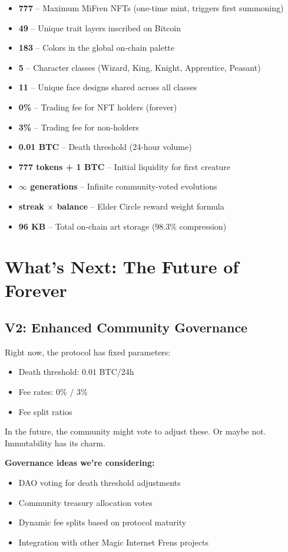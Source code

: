 \documentclass[11pt,a4paper]{article}
\begin{document}
\begin{itemize}
    \item \textbf{777} -- Maximum MiFren NFTs (one-time mint, triggers first summoning)
    \item \textbf{49} -- Unique trait layers inscribed on Bitcoin
    \item \textbf{183} -- Colors in the global on-chain palette
    \item \textbf{5} -- Character classes (Wizard, King, Knight, Apprentice, Peasant)
    \item \textbf{11} -- Unique face designs shared across all classes
    \item \textbf{0\%} -- Trading fee for NFT holders (forever)
    \item \textbf{3\%} -- Trading fee for non-holders
    \item \textbf{0.01 BTC} -- Death threshold (24-hour volume)
    \item \textbf{777 tokens + 1 BTC} -- Initial liquidity for first creature
    \item \textbf{$\infty$ generations} -- Infinite community-voted evolutions
    \item \textbf{streak $\times$ balance} -- Elder Circle reward weight formula
    \item \textbf{96 KB} -- Total on-chain art storage (98.3\% compression)
\end{itemize}

\section{What's Next: The Future of Forever}

\subsection{V2: Enhanced Community Governance}

Right now, the protocol has fixed parameters:
\begin{itemize}
    \item Death threshold: 0.01 BTC/24h
    \item Fee rates: 0\% / 3\%
    \item Fee split ratios
\end{itemize}

In the future, the community might vote to adjust these. Or maybe not. Immutability has its charm.

\textbf{Governance ideas we're considering:}
\begin{itemize}
    \item DAO voting for death threshold adjustments
    \item Community treasury allocation votes
    \item Dynamic fee splits based on protocol maturity
    \item Integration with other Magic Internet Frens projects
\end{itemize}
\end{document}
